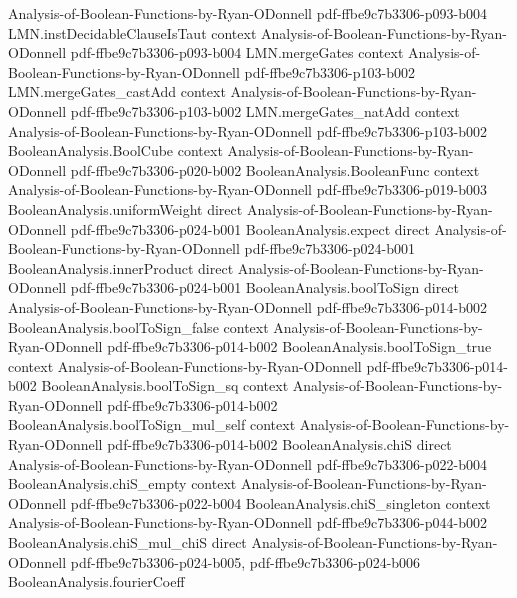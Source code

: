 \begin{lemma}
  {Analysis-of-Boolean-Functions-by-Ryan-ODonnell}
  {pdf-ffbe9c7b3306-p093-b004}
\proofstep
  {LMN.instDecidableClauseIsTaut}
  {context}
  {Analysis-of-Boolean-Functions-by-Ryan-ODonnell}
  {pdf-ffbe9c7b3306-p093-b004}
\proofstep
  {LMN.mergeGates}
  {context}
  {Analysis-of-Boolean-Functions-by-Ryan-ODonnell}
  {pdf-ffbe9c7b3306-p103-b002}
\proofstep
  {LMN.mergeGates_castAdd}
  {context}
  {Analysis-of-Boolean-Functions-by-Ryan-ODonnell}
  {pdf-ffbe9c7b3306-p103-b002}
\proofstep
  {LMN.mergeGates_natAdd}
  {context}
  {Analysis-of-Boolean-Functions-by-Ryan-ODonnell}
  {pdf-ffbe9c7b3306-p103-b002}
\proofstep
  {BooleanAnalysis.BoolCube}
  {context}
  {Analysis-of-Boolean-Functions-by-Ryan-ODonnell}
  {pdf-ffbe9c7b3306-p020-b002}
\proofstep
  {BooleanAnalysis.BooleanFunc}
  {context}
  {Analysis-of-Boolean-Functions-by-Ryan-ODonnell}
  {pdf-ffbe9c7b3306-p019-b003}
\proofstep
  {BooleanAnalysis.uniformWeight}
  {direct}
  {Analysis-of-Boolean-Functions-by-Ryan-ODonnell}
  {pdf-ffbe9c7b3306-p024-b001}
\proofstep
  {BooleanAnalysis.expect}
  {direct}
  {Analysis-of-Boolean-Functions-by-Ryan-ODonnell}
  {pdf-ffbe9c7b3306-p024-b001}
\proofstep
  {BooleanAnalysis.innerProduct}
  {direct}
  {Analysis-of-Boolean-Functions-by-Ryan-ODonnell}
  {pdf-ffbe9c7b3306-p024-b001}
\proofstep
  {BooleanAnalysis.boolToSign}
  {direct}
  {Analysis-of-Boolean-Functions-by-Ryan-ODonnell}
  {pdf-ffbe9c7b3306-p014-b002}
\proofstep
  {BooleanAnalysis.boolToSign_false}
  {context}
  {Analysis-of-Boolean-Functions-by-Ryan-ODonnell}
  {pdf-ffbe9c7b3306-p014-b002}
\proofstep
  {BooleanAnalysis.boolToSign_true}
  {context}
  {Analysis-of-Boolean-Functions-by-Ryan-ODonnell}
  {pdf-ffbe9c7b3306-p014-b002}
\proofstep
  {BooleanAnalysis.boolToSign_sq}
  {context}
  {Analysis-of-Boolean-Functions-by-Ryan-ODonnell}
  {pdf-ffbe9c7b3306-p014-b002}
\proofstep
  {BooleanAnalysis.boolToSign_mul_self}
  {context}
  {Analysis-of-Boolean-Functions-by-Ryan-ODonnell}
  {pdf-ffbe9c7b3306-p014-b002}
\proofstep
  {BooleanAnalysis.chiS}
  {direct}
  {Analysis-of-Boolean-Functions-by-Ryan-ODonnell}
  {pdf-ffbe9c7b3306-p022-b004}
\proofstep
  {BooleanAnalysis.chiS_empty}
  {context}
  {Analysis-of-Boolean-Functions-by-Ryan-ODonnell}
  {pdf-ffbe9c7b3306-p022-b004}
\proofstep
  {BooleanAnalysis.chiS_singleton}
  {context}
  {Analysis-of-Boolean-Functions-by-Ryan-ODonnell}
  {pdf-ffbe9c7b3306-p044-b002}
\proofstep
  {BooleanAnalysis.chiS_mul_chiS}
  {direct}
  {Analysis-of-Boolean-Functions-by-Ryan-ODonnell}
  {pdf-ffbe9c7b3306-p024-b005,
    pdf-ffbe9c7b3306-p024-b006}
\proofstep
  {BooleanAnalysis.fourierCoeff}

\end{lemma}
